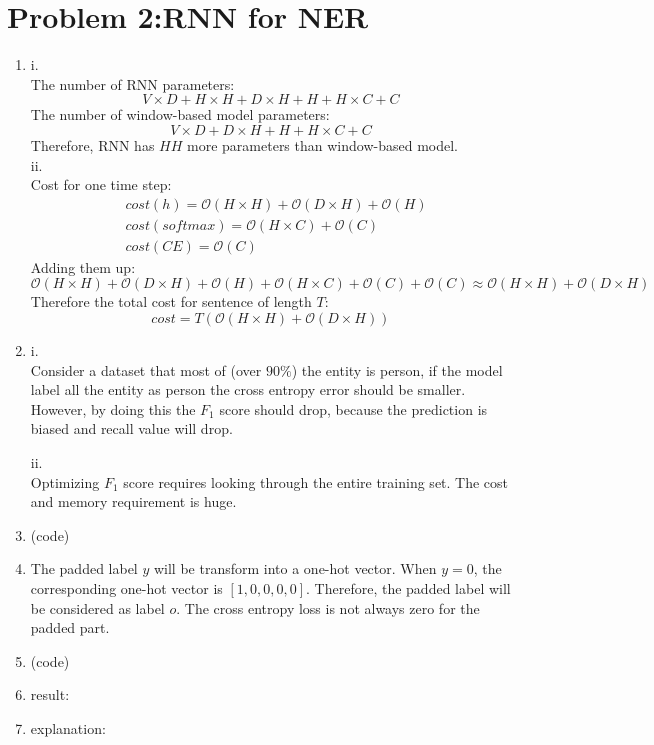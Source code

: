 \documentclass[10pt]{article}
\begin{document}
\section*{Problem 2:RNN for NER}
\begin{enumerate}[label=(\alph*)]
\item
i.\\
The number of RNN parameters:
$$
V \times D + H \times H + D \times H + H + H \times C + C
$$
The number of window-based model parameters:
$$
V \times D + D \times H + H + H \times C + C
$$
Therefore, RNN has $HH$ more parameters than window-based model.\\

ii.\\
Cost for one time step:
$$
\begin{aligned}
& cost(h) = \mathcal{O}(H \times H) + \mathcal{O}(D \times H) + \mathcal{O}(H)\\
& cost(softmax) = \mathcal{O}(H \times C) + \mathcal{O}(C)\\
& cost(CE) = \mathcal{O}(C)
\end{aligned}
$$
Adding them up:
$$
\mathcal{O}(H \times H) + \mathcal{O}(D \times H) + \mathcal{O}(H) + \mathcal{O}(H \times C) + \mathcal{O}(C) + \mathcal{O}(C) \approx \mathcal{O}(H \times H) + \mathcal{O}(D \times H)
$$
Therefore the total cost for sentence of length $T$:
$$
cost = T(\mathcal{O}(H \times H) + \mathcal{O}(D \times H))
$$

\item
i.\\
Consider a dataset that most of (over $90\%$) the entity is person,
if the model label all the entity as person the cross entropy error should be smaller.
However, by doing this the $F_1$ score should drop, because the prediction is biased and recall value will drop.

ii.\\
Optimizing $F_1$ score requires looking through the entire training set. The cost and memory requirement is huge.

\item
(code)

\item
The padded label $y$ will be transform into a one-hot vector.
When $y=0$, the corresponding one-hot vector is $[1, 0, 0, 0, 0]$.
Therefore, the padded label will be considered as label $o$.
The cross entropy loss is not always zero for the padded part.

\item
(code)

\item
result:

\item
explanation:

\end{enumerate}
\clearpage
\end{document}
